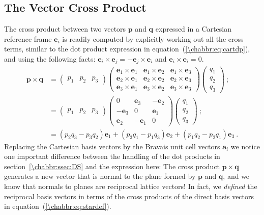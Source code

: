 \subsection{The Vector Cross Product}\label{\chabbr:ssec:crossproduct}
The cross product between two vectors $\mathbf{p}$ and $\mathbf{q}$ expressed in a Cartesian reference frame $\mathbf{e}_i$ is readily computed by explicitly working out all the cross terms, similar to the dot product expression in equation~(\ref{\chabbr:eq:cartdp}), and using the following facts: $\mathbf{e}_i\times\mathbf{e}_j=-\mathbf{e}_j\times\mathbf{e}_i$ and $\mathbf{e}_i\times\mathbf{e}_i=0$.
\begin{equation}
\begin{split}
\mathbf{p}\times\mathbf{q} &= \begin{pmatrix}p_1&p_2&p_3\end{pmatrix}\begin{pmatrix}	
	\mathbf{e}_1\times\mathbf{e}_1 & \mathbf{e}_1\times\mathbf{e}_2 & \mathbf{e}_1\times\mathbf{e}_3 \\
	\mathbf{e}_2\times\mathbf{e}_1 & \mathbf{e}_2\times\mathbf{e}_2 & \mathbf{e}_2\times\mathbf{e}_3 \\
	\mathbf{e}_3\times\mathbf{e}_1 & \mathbf{e}_3\times\mathbf{e}_2 & \mathbf{e}_3\times\mathbf{e}_3\end{pmatrix}
	\begin{pmatrix}q_1\\ q_2\\ q_3\end{pmatrix}\ ; \\
	&=\begin{pmatrix}p_1&p_2&p_3\end{pmatrix}\begin{pmatrix}	
	0 & \mathbf{e}_3 & -\mathbf{e}_2 \\
	-\mathbf{e}_3 & 0 & \mathbf{e}_1 \\
	\mathbf{e}_2 & -\mathbf{e}_1 &0\end{pmatrix}
	\begin{pmatrix}q_1\\ q_2\\ q_3\end{pmatrix}\ ;\\
	&=(p_2q_3-p_3q_2)\mathbf{e}_1+(p_3q_1-p_1q_3)\mathbf{e}_2+(p_1q_2-p_2q_1)\mathbf{e}_3\ .\label{\chabbr:eq:cartcp}
\end{split}
\end{equation}
Replacing the Cartesian basis vectors by the Bravais unit cell vectors $\mathbf{a}_i$ we notice one important difference between the handling of the dot products in section~\ref{\chabbr:ssec:DS} and the expression here: The cross product $\mathbf{p}\times\mathbf{q}$ generates a new vector that is normal to the plane formed by $\mathbf{p}$ and $\mathbf{q}$, and we know that normals to planes are reciprocal lattice vectors!  In fact, we \textit{defined} the reciprocal basis vectors in terms of the cross products of the direct basis vectors in equation~(\ref{\chabbr:eq:stardef}). 
